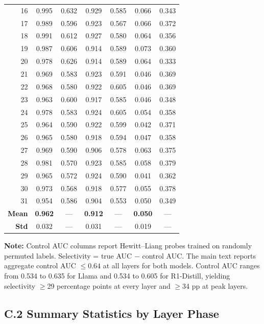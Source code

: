 \documentclass[accepted]{article}
\begin{document}
\begin{longtable}{rcccccc}
16 & 0.995 & 0.632 & 0.929 & 0.585 & 0.066 & 0.343 \\
17 & 0.989 & 0.596 & 0.923 & 0.567 & 0.066 & 0.372 \\
18 & 0.991 & 0.612 & 0.927 & 0.580 & 0.064 & 0.356 \\
19 & 0.987 & 0.606 & 0.914 & 0.589 & 0.073 & 0.360 \\
20 & 0.978 & 0.626 & 0.914 & 0.589 & 0.064 & 0.333 \\
21 & 0.969 & 0.583 & 0.923 & 0.591 & 0.046 & 0.369 \\
22 & 0.968 & 0.580 & 0.922 & 0.605 & 0.046 & 0.369 \\
23 & 0.963 & 0.600 & 0.917 & 0.585 & 0.046 & 0.348 \\
24 & 0.978 & 0.583 & 0.924 & 0.605 & 0.054 & 0.358 \\
25 & 0.964 & 0.590 & 0.922 & 0.599 & 0.042 & 0.371 \\
26 & 0.965 & 0.580 & 0.918 & 0.594 & 0.047 & 0.358 \\
27 & 0.969 & 0.590 & 0.906 & 0.578 & 0.063 & 0.375 \\
28 & 0.981 & 0.570 & 0.923 & 0.585 & 0.058 & 0.379 \\
29 & 0.965 & 0.572 & 0.924 & 0.590 & 0.041 & 0.362 \\
30 & 0.973 & 0.568 & 0.918 & 0.577 & 0.055 & 0.378 \\
31 & 0.954 & 0.586 & 0.904 & 0.553 & 0.050 & 0.349 \\
\midrule
\textbf{Mean} & \textbf{0.962} & --- & \textbf{0.912} & --- & \textbf{0.050} & --- \\
\textbf{Std} & 0.032 & --- & 0.031 & --- & 0.019 & --- \\
\end{longtable}

\noindent \textbf{Note:} Control AUC columns report Hewitt--Liang probes
trained on randomly permuted labels.  Selectivity = true AUC $-$ control AUC.
The main text
reports aggregate control AUC $\leq 0.64$ at all layers for both
models.  Control AUC ranges from 0.534 to 0.635 for Llama and 0.534
to 0.605 for R1-Distill, yielding selectivity $\geq$29 percentage
points at every layer and $\geq$34 pp at peak layers.

\subsection*{C.2 Summary Statistics by Layer Phase}
\end{document}
